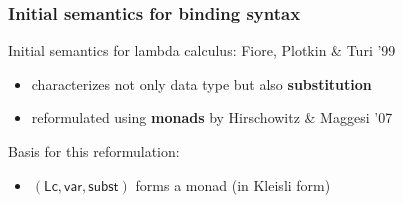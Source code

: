 \documentclass[
]
{beamer}
\newcommand{\constfont}[1]{\ensuremath{\mathsf{#1}}}
\newcommand{\subst}{\constfont{subst}}
\newcommand{\Var}{\constfont{var}}
\newcommand{\LC}{\mathsf{Lc}}
\newcommand{\fat}[1]{\textbf{#1}}
\begin{document}
\begin{frame}
 \frametitle{Initial semantics for binding syntax}
    
    \begin{block}{Initial semantics for lambda calculus: Fiore, Plotkin \& Turi '99}
      \begin{itemize}
       \item characterizes not only data type but also \fat{substitution} %
       \item reformulated using \fat{monads} by Hirschowitz \& Maggesi '07
      \end{itemize}
    \end{block}

  Basis for this reformulation:
    
    \begin{lemma}
       \begin{itemize}
         \item [] $(\LC, \Var, \subst)$ forms a monad (in Kleisli form)
       \end{itemize}

    \end{lemma}

    
%     

\end{frame}
\end{document}

